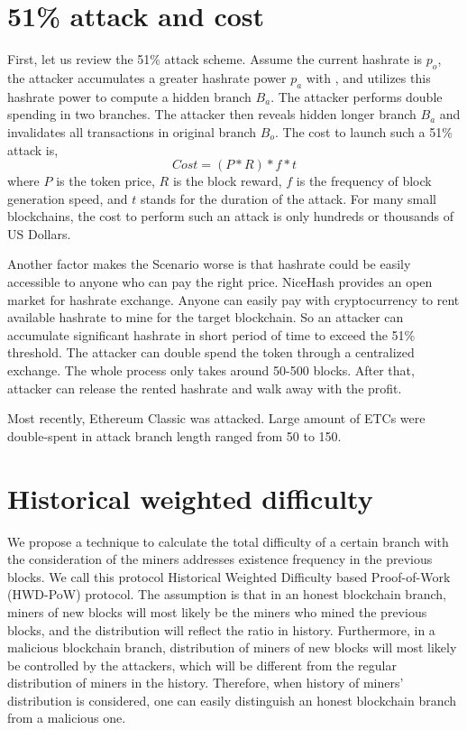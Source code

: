 \documentclass[conference]{IEEEtran}
\begin{document}
\section{51\% attack and cost}
First, let us review the 51\% attack scheme. Assume the current hashrate is $p_o$, the attacker accumulates a greater hashrate power $p_a$ with , and utilizes this hashrate power to compute a hidden branch $B_a$. The attacker performs double spending in two branches. The attacker then reveals hidden longer branch $B_a$ and invalidates all transactions in original branch $B_o$. The cost to launch such a 51\% attack is,
\begin{equation}
Cost=(P*R)*f*t\label{eq_cost}
\end{equation}
where $P$ is the token price, $R$ is the block reward, $f$ is the frequency of block generation speed, and $t$ stands for the duration of the attack.
For many small blockchains, the cost to perform such an attack is only hundreds or thousands of US Dollars\cite{b9}.

Another factor makes the Scenario worse is that hashrate could be easily accessible to anyone who can pay the right price. NiceHash\cite{b10} provides an open market for hashrate exchange. Anyone can easily pay with cryptocurrency to rent available hashrate to mine for the target blockchain. So an attacker can accumulate significant hashrate in short period of time to exceed the 51\% threshold. The attacker can double spend the token through a centralized exchange. The whole process only takes around 50-500 blocks. After that, attacker can release the rented hashrate and walk away with the profit. 

Most recently, Ethereum Classic\cite{b11} was attacked. Large amount of ETCs were double-spent in attack branch length ranged from 50 to 150.

\section{Historical weighted difficulty}

We propose a technique to calculate the total difficulty of a certain branch with the consideration of the miners addresses existence frequency in the previous blocks. We call this protocol Historical Weighted Difficulty based Proof-of-Work (HWD-PoW) protocol. The assumption is that in an honest blockchain branch, miners of new blocks will most likely be the miners who mined the previous blocks, and the distribution will reflect the ratio in history. Furthermore, in a malicious blockchain branch, distribution of miners of new blocks will most likely be controlled by the attackers, which will be different from the regular distribution of miners in the history. Therefore, when history of miners' distribution is considered, one can easily distinguish an honest blockchain branch from a malicious one.
\end{document}
